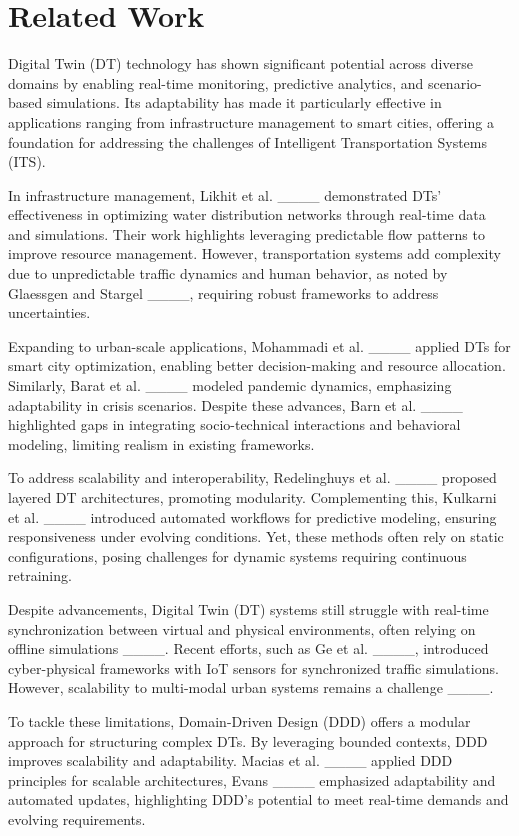 \section{Related Work}
Digital Twin (DT) technology has shown significant potential across diverse domains by enabling real-time monitoring, predictive analytics, and scenario-based simulations. Its adaptability has made it particularly effective in applications ranging from infrastructure management to smart cities, offering a foundation for addressing the challenges of Intelligent Transportation Systems (ITS).

In infrastructure management, Likhit et al. ____ demonstrated DTs' effectiveness in optimizing water distribution networks through real-time data and simulations. Their work highlights leveraging predictable flow patterns to improve resource management. However, transportation systems add complexity due to unpredictable traffic dynamics and human behavior, as noted by Glaessgen and Stargel ____, requiring robust frameworks to address uncertainties.

Expanding to urban-scale applications, Mohammadi et al. ____ applied DTs for smart city optimization, enabling better decision-making and resource allocation. Similarly, Barat et al. ____ modeled pandemic dynamics, emphasizing adaptability in crisis scenarios. Despite these advances, Barn et al. ____ highlighted gaps in integrating socio-technical interactions and behavioral modeling, limiting realism in existing frameworks.

To address scalability and interoperability, Redelinghuys et al. ____ proposed layered DT architectures, promoting modularity. Complementing this, Kulkarni et al. ____ introduced automated workflows for predictive modeling, ensuring responsiveness under evolving conditions. Yet, these methods often rely on static configurations, posing challenges for dynamic systems requiring continuous retraining.

Despite advancements, Digital Twin (DT) systems still struggle with real-time synchronization between virtual and physical environments, often relying on offline simulations ____. Recent efforts, such as Ge et al. ____, introduced cyber-physical frameworks with IoT sensors for synchronized traffic simulations. However, scalability to multi-modal urban systems remains a challenge ____.

To tackle these limitations, Domain-Driven Design (DDD) offers a modular approach for structuring complex DTs. By leveraging bounded contexts, DDD improves scalability and adaptability. Macias et al. ____ applied DDD principles for scalable architectures, Evans ____ emphasized adaptability and automated updates, highlighting DDD's potential to meet real-time demands and evolving requirements.

